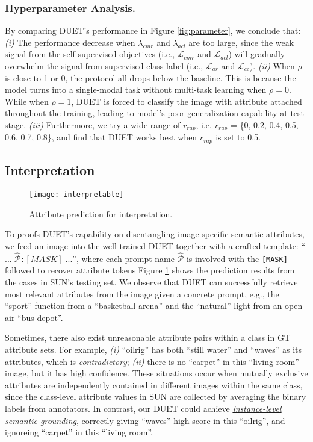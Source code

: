 \documentclass[letterpaper]{article} \usepackage{aaai23}  \usepackage{times}  \usepackage{helvet}  \usepackage{courier}  \usepackage[hyphens]{url}  \usepackage{graphicx} \urlstyle{rm} \def\UrlFont{\rm}  \usepackage{natbib}  \usepackage{caption} \frenchspacing  \setlength{\pdfpagewidth}{8.5in}  \setlength{\pdfpageheight}{11in}  \usepackage{algorithm}
\newcommand{\fy}[1]{{\color{black}#1}}
\begin{document}
\subsubsection{\textbf{Hyperparameter Analysis.}}
By comparing DUET's performance in Figure \ref{fig:parameter}, 
we conclude that:
\textit{(i)} 
The performance decrease when $\lambda_{cmr}$ and $\lambda_{acl}$ are too large, since the weak signal from the self-supervised objective{s} (i.e., $\mathcal{L}_{cmr}$ and $\mathcal{L}_{acl}$) will gradually overwhelm the signal from supervised class label (i.e., $\mathcal{L}_{ar}$ and $\mathcal{L}_{cc}$).
\textit{(ii)} 
When $\rho$ is close to 1 or 0, the protocol all drops below the baseline.
This is because the model turns into a single-modal task without multi-task learning when $\rho=0$. While when $\rho=1$, DUET is forced to classify the image with attribute attached \fy{throughout} the training, \fy{leading to} model's poor generalization capability at test stage.
\textit{(iii)} 
Furthermore, we try a wide range of $r_{rap}$, i.e. $r_{rap}$ = \{0, 0.2, 0.4, 0.5, 0.6, 0.7, 0.8\}, and \fy{find that} DUET \fy{works best} when $r_{rap}$ is set to 0.5.


\subsection{Interpretation
}
\begin{figure}[htbp]
  \centering
  \texttt{[image: interpretable]}
  \vspace{-2pt}
  \caption{{Attribute prediction for interpretation.}
}
  \label{fig:interpretable}
  \vspace{-5pt}
\end{figure}
To proofs DUET's capability on disentangling image-specific semantic attribute\fy{s},
we feed an image into the well-trained DUET together with a crafted template: ``{\tt $...| \widehat{\mathcal{P}}$:$[MASK]|...$}'', 
where each prompt name $\widehat{\mathcal{P}}$ is involved with the {\tt [MASK]} followed to recover attribute tokens 
Figure \ref{fig:interpretable} shows the prediction results from the cases in SUN's testing set.
We observe that DUET can successfully retrieve most relevant attributes from the image given {a} concrete prompt, e.g., the ``sport'' function from a ``basketball arena'' and the ``natural'' light from an open-air ``bus depot''.

Sometimes, there also exist unreasonable attribute pairs within a class in GT attribute sets.
{For example,}
\textit{(i)} ``oilrig'' has \fy{both} ``still water'' and ``waves'' as its attributes, which is \ul{\emph{contradictory}}{;} 
\textit{(ii)} there is no ``carpet'' in this ``living room'' image, but it has high confidence.
These \fy{situations occur} when mutually exclusive attributes \fy{are} independently contained in different images within the same class, since the class-level attribute values in SUN are collected by averaging the binary labels from  annotators.
In contrast, our DUET could achieve \ul{\emph{instance-level semantic grounding}}, correctly \fy{giving} ``waves'' high score in this ``oilrig'', and ignore\fy{ing} ``carpet'' in this ``living room''.
\end{document}
